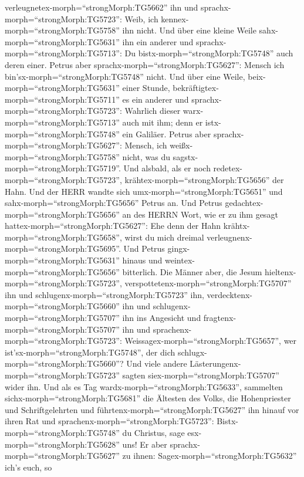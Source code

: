verleugnetex-morph=``strongMorph:TG5662'' ihn und
sprachx-morph=``strongMorph:TG5723'': Weib, ich
kennex-morph=``strongMorph:TG5758'' ihn nicht.  Und über
eine kleine Weile sahx-morph=``strongMorph:TG5631'' ihn ein anderer und
sprachx-morph=``strongMorph:TG5713'': Du
bistx-morph=``strongMorph:TG5748'' auch deren einer. Petrus aber
sprachx-morph=``strongMorph:TG5627'': Mensch ich
bin'sx-morph=``strongMorph:TG5748'' nicht.  Und über eine
Weile, beix-morph=``strongMorph:TG5631'' einer Stunde,
bekräftigtex-morph=``strongMorph:TG5711'' es ein anderer und
sprachx-morph=``strongMorph:TG5723'': Wahrlich dieser
warx-morph=``strongMorph:TG5713'' auch mit ihm; denn er
istx-morph=``strongMorph:TG5748'' ein Galiläer.  Petrus
aber sprachx-morph=``strongMorph:TG5627'': Mensch, ich
weißx-morph=``strongMorph:TG5758'' nicht, was du
sagstx-morph=``strongMorph:TG5719''. Und alsbald, als er noch
redetex-morph=``strongMorph:TG5723'',
krähtex-morph=``strongMorph:TG5656'' der Hahn.  Und der
HERR wandte sich umx-morph=``strongMorph:TG5651'' und
sahx-morph=``strongMorph:TG5656'' Petrus an. Und Petrus
gedachtex-morph=``strongMorph:TG5656'' an des HERRN Wort, wie er zu ihm
gesagt hattex-morph=``strongMorph:TG5627'': Ehe denn der Hahn
krähtx-morph=``strongMorph:TG5658'', wirst du mich dreimal
verleugnenx-morph=``strongMorph:TG5695''.  Und Petrus
gingx-morph=``strongMorph:TG5631'' hinaus und
weintex-morph=``strongMorph:TG5656'' bitterlich.  Die
Männer aber, die Jesum hieltenx-morph=``strongMorph:TG5723'',
verspottetenx-morph=``strongMorph:TG5707'' ihn und
schlugenx-morph=``strongMorph:TG5723'' ihn, 
verdecktenx-morph=``strongMorph:TG5660'' ihn und
schlugenx-morph=``strongMorph:TG5707'' ihn ins Angesicht und
fragtenx-morph=``strongMorph:TG5707'' ihn und
sprachenx-morph=``strongMorph:TG5723'':
Weissagex-morph=``strongMorph:TG5657'', wer
ist'sx-morph=``strongMorph:TG5748'', der dich
schlugx-morph=``strongMorph:TG5660''?  Und viele andere
Lästerungenx-morph=``strongMorph:TG5723'' sagten
siex-morph=``strongMorph:TG5707'' wider ihn.  Und als es
Tag wardx-morph=``strongMorph:TG5633'', sammelten
sichx-morph=``strongMorph:TG5681'' die Ältesten des Volks, die
Hohenpriester und Schriftgelehrten und
führtenx-morph=``strongMorph:TG5627'' ihn hinauf vor ihren Rat
 und sprachenx-morph=``strongMorph:TG5723'':
Bistx-morph=``strongMorph:TG5748'' du Christus, sage
esx-morph=``strongMorph:TG5628'' uns! Er aber
sprachx-morph=``strongMorph:TG5627'' zu ihnen:
Sagex-morph=``strongMorph:TG5632'' ich's euch, so
